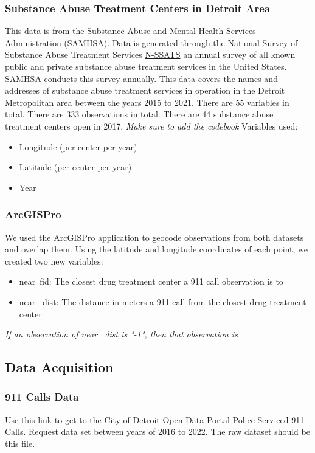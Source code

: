 \documentclass[12pt]{article}
\begin{document}
\subsubsection{Substance Abuse Treatment Centers in Detroit Area}
This data is from the Substance Abuse and Mental Health Services Administration (SAMHSA). Data is generated through the National Survey of Substance Abuse Treatment Services \href{https://www.samhsa.gov/data/data-we-collect/n-ssats-national-survey-substance-abuse-treatment-services}{N-SSATS} an annual survey of all known public and private substance abuse treatment services in the United States. SAMHSA conducts this survey annually. This data covers the names and addresses of substance abuse treatment services in operation in the Detroit Metropolitan area between the years 2015 to 2021. There are 55 variables in total. There are 333 observations in total. There are 44 substance abuse treatment centers open in 2017.
\textit{Make sure to add the codebook}
Variables used:
\begin{itemize}
    \item Longitude (per center per year)
    \item Latitude (per center per year)
    \item Year
\end{itemize}

\subsubsection{ArcGISPro}
We used the ArcGISPro application to geocode observations from both datasets and overlap them. Using the latitude and longitude coordinates of each point, we created two new variables:
\begin{itemize}
    \item near\textunderscore\ fid: The closest drug treatment center a 911 call observation is to
    \item near \textunderscore\ dist: The distance in meters a 911 call from the closest drug treatment center
\end{itemize}
\textit{If an observation of near \textunderscore\ dist is "-1", then that observation is }

\subsection{Data Acquisition}
\subsubsection{911 Calls Data}
Use this \href{https://data.detroitmi.gov/datasets/detroitmi::police-serviced-911-calls/about}{link} to get to the City of Detroit Open Data Portal Police Serviced 911 Calls. Request data set between years of 2016 to 2022. The raw dataset should be this \href{https://www.dropbox.com/scl/fi/mvlni30fz74qx4fclofmc/calls_final.csv?rlkey=drs9rkqlgyo9i8gsf9823prof&e=1&dl=0}{file}.
\end{document}
